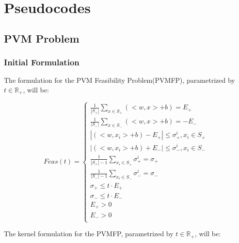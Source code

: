 \documentclass[a4paper,twoside,10pt]{report}
\begin{document}
	
	
\chapter{Pseudocodes}
	
\section{PVM Problem}\label{pvm_feas}

\subsection{Initial Formulation}

	The formulation for the PVM Feasibility Problem(PVMFP), parametrized by \( t \in \mathbb{R}_+ \), will be:
	
	\[
		Feas(t) = \left\{
		\begin{array}{l}			
				\frac{1}{|S_+|} \sum_{x\in S_+} {(<w,x> + b)} = {E_+}\\
				\frac{1}{|S_-|} \sum_{x\in S_-} {(<w,x> + b)} = -{E_-}\\
				
				|(<w,x_i> + b) - E_+| \leq \sigma_+^i, x_i\in S_+\\
				|(<w,x_i> + b) + E_-| \leq \sigma_-^i, x_i\in S_-\\
				
				\frac{1}{|S_+| - 1} \sum_{x_i\in S_+} {\sigma_+^i} = {\sigma_+} \\ %
				\frac{1}{|S_-| - 1} \sum_{x_i\in S_-} {\sigma_-^i} = {\sigma_-} \\ %
				
				\sigma_+ \leq t \cdot E_+\\
				\sigma_- \leq t \cdot E_-\\
				E_+ > 0\\
				E_- > 0\\
		\end{array}
		\right. \label{feas_0}
	\]
	
	The kernel formulation for the PVMFP, parametrized by \( t \in \mathbb{R}_+ \), will be:
	
\end{document}
